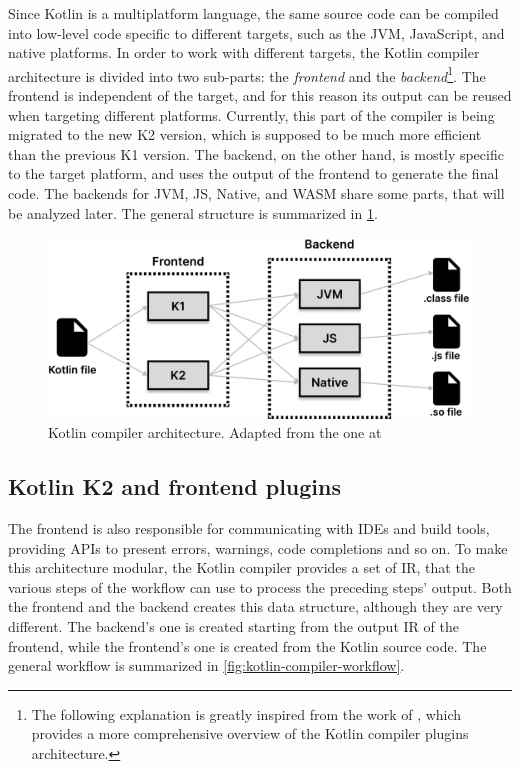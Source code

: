 \documentclass[12pt,a4paper,openright,twoside]{book}
\begin{document}
Since Kotlin is a multiplatform language, the same source code can be compiled
into low-level code specific to different targets, such as the JVM, JavaScript,
and native platforms. In order to work with different targets, the Kotlin
compiler architecture is divided into two sub-parts: the \emph{frontend} and the
\emph{backend}\footnote{The following explanation is greatly
inspired from the work of \cite{moskala2023}, which provides a more
comprehensive overview of the Kotlin compiler plugins architecture.}.
%
The frontend is independent of the target, and for this reason its output can be 
reused when targeting different platforms. Currently, this part of the compiler 
is being migrated to the new K2 version, which is supposed to be much more 
efficient than the previous K1 version.
%
The backend, on the other hand, is mostly specific to the target platform, and
uses the output of the frontend to generate the final code. The backends for
JVM, JS, Native, and WASM share some parts, that will be analyzed later. The
general structure is summarized in \cref{fig:kotlin-compiler-architecture}.

\begin{figure}
  \centering
  \includegraphics[width=.8\linewidth]{figures/kotlin-compiler-architecture.pdf}
  \caption{Kotlin compiler architecture. Adapted from the one at \cite{moskala2023}}
  \label{fig:kotlin-compiler-architecture}
\end{figure}

\subsection{Kotlin K2 and frontend plugins}

The frontend is also responsible for communicating with IDEs and build tools, 
providing APIs to present errors, warnings, code completions and so on. 
%
To make this architecture modular, the Kotlin compiler provides a set of 
\ac{IR}, that the various steps of the workflow
can use to process the preceding steps' output. Both the frontend and the
backend creates this data structure, although they are very different. The 
backend's one is created starting from the output \ac{IR} of the frontend,
while the frontend's one is created from the Kotlin source code. 
The general workflow is summarized in \cref{fig:kotlin-compiler-workflow}.
\end{document}
